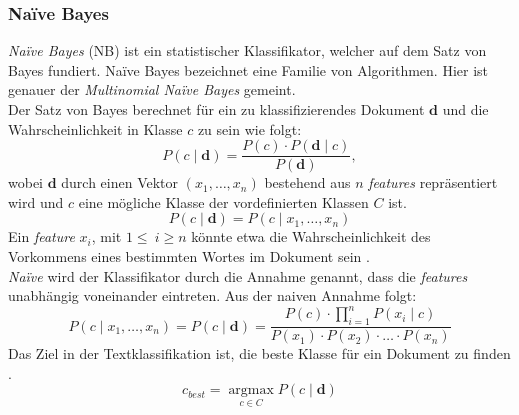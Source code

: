 \documentclass[ngerman]{ttlab-qualify}
\begin{document}
\subsubsection{Naïve Bayes} \label{NB}
\textit{Naïve Bayes} (NB) ist ein statistischer Klassifikator, welcher auf dem Satz von Bayes fundiert. Naïve Bayes bezeichnet eine Familie von Algorithmen. Hier ist genauer der \textit{Multinomial Naïve Bayes} gemeint.\\
Der Satz von Bayes berechnet für ein zu klassifizierendes Dokument \(\mathbf{d}\) und die Wahrscheinlichkeit in Klasse \(c\) zu sein wie folgt: \[P(c \mid \mathbf{d}) = \frac{P(c) \cdot P(\mathbf{d} \mid c)}{P(\mathbf{d})}, \] wobei \(\mathbf{d}\) durch einen Vektor \((x_1, \ldots, x_n)\) bestehend aus \(n\) \textit{features} repräsentiert wird und \(c\) eine mögliche Klasse der vordefinierten Klassen \(C\) ist.
\[P(c \mid \mathbf{d}) = P(c \mid x_1, \ldots, x_n)\]
Ein \textit{feature} \(x_i\), mit  \(1 \leq \ i \geq n\) könnte etwa die Wahrscheinlichkeit des Vorkommens eines bestimmten Wortes im Dokument sein \parencite{manning2008introduction}.\\
\textit{Naïve} wird der Klassifikator durch die Annahme genannt, dass die \textit{features} unabhängig voneinander eintreten. Aus der naiven Annahme folgt: \\
\[P(c \mid x_1, \ldots, x_n) = P(c \mid \mathbf{d}) = \frac{P(c) \cdot \prod_{i = 1}^{n}{P(x_i \mid c)}}{P(x_1) \cdot P(x_2)\cdot \ldots \cdot P(x_n)}\]
Das Ziel in der Textklassifikation ist, die beste Klasse für ein Dokument zu finden \parencite{manning2008introduction}.
\[c_{best} = \operatorname*{argmax}_{c \in C} P(c \mid \mathbf{d})\]
\end{document}
